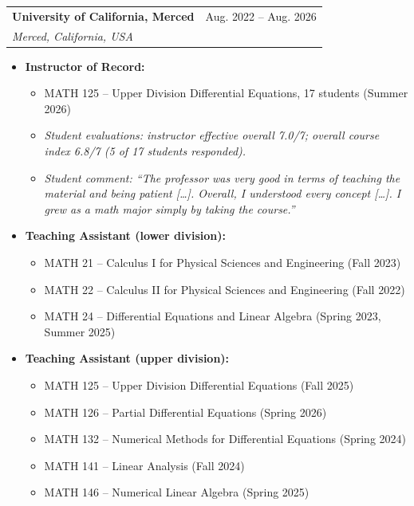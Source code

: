 \documentclass[letterpaper,10pt]{article} %
\makeatletter
\newcommand{\cvdate}[1]{{\small\color{datecol}#1}}
\newcommand{\resumeItem}[1]{
  \item\small{
    {#1 \vspace{-2pt}}
  }
}
\newcommand{\resumeSubheading}[4]{
  \vspace{-2pt}\item
    \begin{tabular*}{1.0\textwidth}[t]{l@{\extracolsep{\fill}}r}
      \textbf{#1} & \cvdate{#2} \\
      \textit{\small#3} & \textit{\small #4} \\
    \end{tabular*}\vspace{-7pt}
}
\newcommand{\resumeItemListStart}{\begin{itemize}}
\newcommand{\resumeItemListEnd}{\end{itemize}\vspace{-5pt}}
\makeatother
\begin{document}
\resumeSubheading
{University of California, Merced}{Aug. 2022 -- Aug. 2026}
{Merced, California, USA}{}
\resumeItemListStart
    \resumeItem{\textbf{\color{subhead}Instructor of Record:}}
    \begin{itemize}[leftmargin=1.5em]
        \item[\textendash] \small MATH 125 -- Upper Division Differential Equations, 17 students (Summer 2026)
        \item[] \small \textit{Student evaluations: instructor effective overall 7.0/7; overall course index 6.8/7 (5 of 17 students responded).}
        \item[] \small \textit{Student comment: ``The professor was very good in terms of teaching the material and being patient [\ldots]. Overall, I understood every concept [\ldots]. I grew as a math major simply by taking the course.''}
    \end{itemize}

    \resumeItem{\textbf{\color{subhead}Teaching Assistant (lower division):}}
    \begin{itemize}[leftmargin=1.5em]
        \item[\textendash] \small MATH 21 -- Calculus I for Physical Sciences and Engineering (Fall 2023)
        \item[\textendash] \small MATH 22 -- Calculus II for Physical Sciences and Engineering (Fall 2022)
        \item[\textendash] \small MATH 24 -- Differential Equations and Linear Algebra (Spring 2023, Summer 2025)
    \end{itemize}

    \resumeItem{\textbf{\color{subhead}Teaching Assistant (upper division):}}
    \begin{itemize}[leftmargin=1.5em]
        \item[\textendash] \small MATH 125 -- Upper Division Differential Equations (Fall 2025)
        \item[\textendash] \small MATH 126 -- Partial Differential Equations (Spring 2026)
        \item[\textendash] \small MATH 132 -- Numerical Methods for Differential Equations (Spring 2024)
        \item[\textendash] \small MATH 141 -- Linear Analysis (Fall 2024)
        \item[\textendash] \small MATH 146 -- Numerical Linear Algebra (Spring 2025)
    \end{itemize}
\resumeItemListEnd
\end{document}
